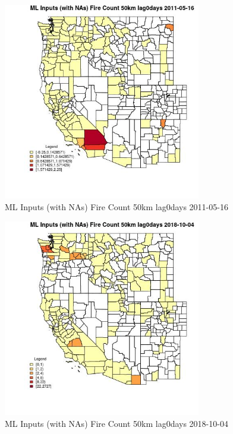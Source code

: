 \begin{figure} 
\centering  
\includegraphics[width=0.77\textwidth]{Code_Outputs/Report_ML_input_PM25_Step4_part_f_de_duplicated_aveswNAs_CountyFire_Count_50km_lag0daysMean2011-05-16.jpg} 
\caption{\label{fig:Report_ML_input_PM25_Step4_part_f_de_duplicated_aveswNAsCountyFire_Count_50km_lag0daysMean2011-05-16}ML Inputs (with NAs) Fire Count 50km lag0days 2011-05-16} 
\end{figure} 
 

\clearpage 

\begin{figure} 
\centering  
\includegraphics[width=0.77\textwidth]{Code_Outputs/Report_ML_input_PM25_Step4_part_f_de_duplicated_aveswNAs_CountyFire_Count_50km_lag0daysMean2018-10-04.jpg} 
\caption{\label{fig:Report_ML_input_PM25_Step4_part_f_de_duplicated_aveswNAsCountyFire_Count_50km_lag0daysMean2018-10-04}ML Inputs (with NAs) Fire Count 50km lag0days 2018-10-04} 
\end{figure} 
 

